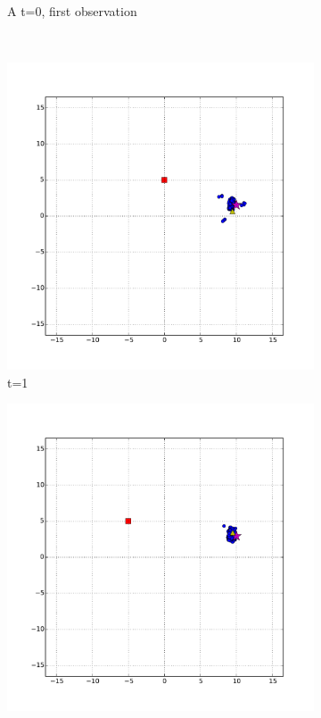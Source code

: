 \begin{figure}
\begin{subfigure}[b]{0.3\textwidth}
	                \caption{A t=0, first observation}
	                \label{fig:vantage_t_0}
	        \end{subfigure}
	        ~ %
	        \begin{subfigure}[b]{0.3\textwidth}
	                \includegraphics[width=\textwidth]{vantage_t_1}
	                \caption{t=1}
	                \label{fig:vantage_t_1}
	        \end{subfigure}
	        \begin{subfigure}[b]{0.3\textwidth}
	                \includegraphics[width=\textwidth]{vantage_t_2}

\end{subfigure}
\end{figure}
